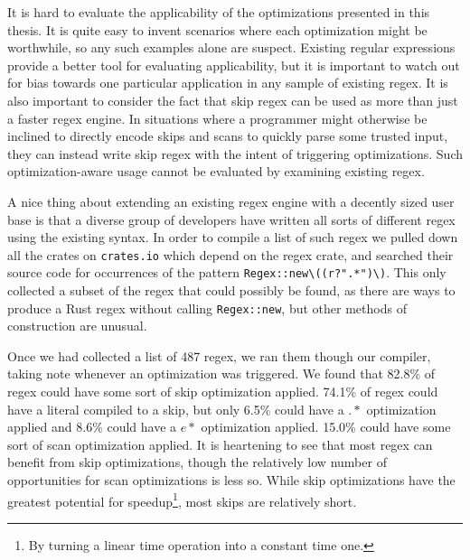It is hard to evaluate the applicability of the optimizations presented
in this thesis. It is quite easy to invent scenarios where each
optimization might be worthwhile, so any such examples alone are
suspect. Existing regular expressions provide a better tool for
evaluating applicability, but it is important to watch out for
bias towards one particular application in any sample of existing
regex. It is also important to consider the fact that skip regex
can be used as more than just a faster regex engine. In situations
where a programmer might otherwise be inclined to directly encode
skips and scans to quickly parse some trusted input, they can
instead write skip regex with the intent of triggering optimizations.
Such optimization-aware usage cannot be evaluated by examining
existing regex.

A nice thing about extending an existing regex engine
with a decently sized user base is that a diverse group of developers
have written all sorts of different regex using the existing syntax.
In order to compile a list of such regex we pulled down all the
crates on \verb'crates.io' which depend on the regex crate, and
searched their source code for occurrences of the pattern
\verb'Regex::new\((r?".*")\)'. This only collected a subset of
the regex that could possibly be found, as there are ways to
produce a Rust regex without calling \verb'Regex::new', but
other methods of construction are unusual.

Once we had collected
a list of 487 regex, we ran them though our compiler, taking
note whenever an optimization was triggered. We found that
82.8\% of regex could have some sort of skip optimization
applied. 74.1\% of regex could have a literal compiled to a skip,
but only 6.5\% could have a $.*$ optimization applied and 8.6\% could
have a $e*$ optimization applied. 15.0\% could have some sort of
scan optimization applied. It is heartening to see that most regex
can benefit from skip optimizations, though the relatively low number
of opportunities for scan optimizations is less so. While skip
optimizations have the greatest potential for speedup\footnote{By turning
a linear time operation into a constant time one.}, most skips
are relatively short.

